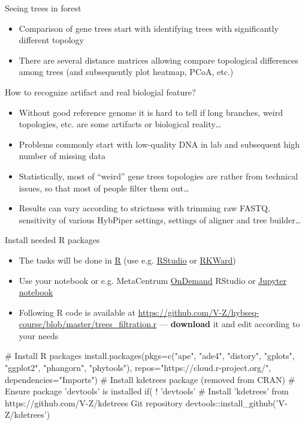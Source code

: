 \documentclass[compress,  xelatex, 11pt, xcolor=x11names, aspectratio=169,
	hyperref={
		bookmarks=true,
		unicode=true,
		colorlinks=true,
		pdftitle={HybSeq course},
		plainpages=false,
		pdfauthor={Vojtech Zeisek},
		pdfsubject={Practical processing of HybSeq target enrichment sequencing data on computing grids like MetaCentrum},
		pdfcreator={XeLaTeX},
		pdfkeywords={BASH, command line, GNU, HybSeq, Linux, MetaCentrum, sequencing shell, target enrichment},
		linkcolor=Turquoise4, %
		anchorcolor=DodgerBlue4, %
		citecolor=DodgerBlue4, %
		filecolor=DodgerBlue4, %
		menucolor=Tan4, %
		urlcolor=DarkOliveGreen4 %
		},
	url={hyphens, lowtilde} %
	]{beamer}
\renewcommand{\alert}[1]{\textcolor{OrangeRed3}{#1}}
\begin{document}
\begin{frame}{Seeing trees in forest}
	\begin{itemize}
		\item Comparison of gene trees start with identifying trees with significantly different topology
		\item There are several distance matrices allowing compare topological differences among trees (and subsequently plot heatmap, PCoA, etc.)
	\end{itemize}
	\begin{block}{How to recognize artifact and real biologial feature?}
		\begin{itemize}
			\item Without good reference genome it is hard to tell if long branches, weird topologies, etc. are some artifacts or biological reality\ldots
			\item Problems commonly start with low-quality DNA in lab and subsequent high number of missing data
			\item Statistically, most of \enquote{weird} gene trees topologies are rather from technical issues, so that most of people filter them out\ldots
			\item Results can vary according to strictness with trimming raw FASTQ, sensitivity of various HybPiper settings, settings of aligner and tree builder\ldots
		\end{itemize}
	\end{block}
\end{frame}

\begin{frame}[fragile]{Install needed R packages}
	\begin{itemize}
		\item The tasks will be done in \href{https://www.r-project.org/}{R} (use e.g. \href{https://posit.co/products/open-source/rstudio/}{RStudio} or \href{https://rkward.kde.org/}{RKWard})
		\item Use your notebook or e.g. MetaCentrum \href{https://docs.metacentrum.cz/en/docs/graphical/ondemand}{OnDemand} RStudio or \href{https://docs.metacentrum.cz/en/docs/software/sw-list/jupyter}{Jupyter notebook}
		\item Following R code is available at \url{https://github.com/V-Z/hybseq-course/blob/master/trees_filtration.r} --- \alert{\textbf{download} it and edit} according to your needs
	\end{itemize}
	\begin{spluscode}
    # Install R packages
    install.packages(pkgs=c("ape", "ade4", "distory", "gplots", "ggplot2",
      "phangorn", "phytools"), repos="https://cloud.r-project.org/",
      dependencies="Imports")
    # Install kdetrees package (removed from CRAN)
    # Ensure package 'devtools' is installed
    if( ! 'devtools' %
    # Install 'kdetrees' from https://github.com/V-Z/kdetrees Git repository
    devtools::install_github('V-Z/kdetrees')
	\end{spluscode}
\end{frame}
\end{document}
